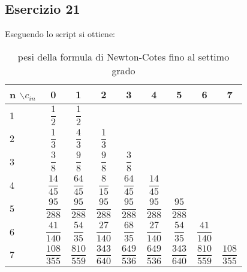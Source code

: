 \subsection{Esercizio 21}

Eseguendo lo script  si ottiene:
\begin{table}[h]
    \centering
    \renewcommand\arraystretch{3}
    \begin{tabular}{|l|c|c|c|c|c|c|c|c|}
        \hline
        n $\backslash c_{in}$ & 0 & 1 & 2 & 3 & 4 & 5 & 6 & 7 \\
        \hline
        1 & $\dfrac{1}{2}$ & $\dfrac{1}{2}$ & & & & &  &\\
        \hline
        2 & $\dfrac{1}{3}$ & $\dfrac{4}{3}$ & $\dfrac{1}{3}$ & & & &&\\
        \hline
        3 &  $\dfrac{3}{8}$ & $\dfrac{9}{8}$ & $\dfrac{9}{8}$ & $\dfrac{3}{8}$ & & & & \\
        \hline
        4 & $\dfrac{14}{45} $ & $\dfrac{64}{45} $ & $\dfrac{8}{15} $ & $\dfrac{64}{45} $ &$\dfrac{14}{45} $ &&&\\
        \hline
        5 & $\dfrac{95}{288}$ & $\dfrac{95}{288}$ & $\dfrac{95}{288}$ & $\dfrac{95}{288}$ & $\dfrac{95}{288}$ & $\dfrac{95}{288}$ &&\\
        \hline
        6 & $\dfrac{41}{140}$ & $\dfrac{54}{35}$ & $\dfrac{27}{140}$ & $\dfrac{68}{35}$ & $\dfrac{27}{140}$ & $\dfrac{54}{35}$ & $\dfrac{41}{140}$ &\\
        \hline
        7 & $\dfrac{108}{355}$ & $\dfrac{810}{559}$ & $\dfrac{343}{640}$ & $\dfrac{649}{536}$ & $\dfrac{649}{536}$  & $\dfrac{343}{640}$ & $\dfrac{810}{559}$ & $\dfrac{108}{355}$\\
        \hline
    \end{tabular}
    \caption{pesi della formula di Newton-Cotes fino al settimo grado}
\end{table}